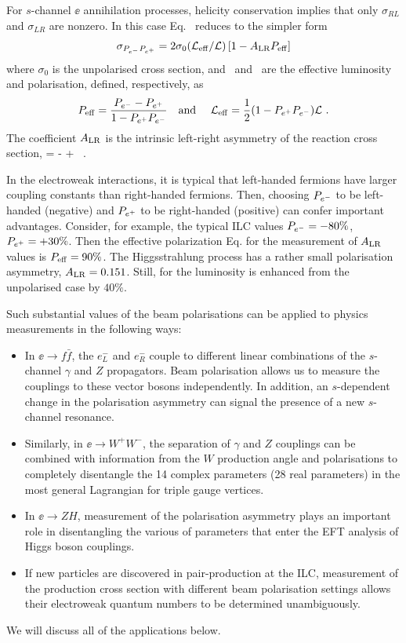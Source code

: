 For $s$-channel $\ee$ annihilation processes, helicity conservation implies that only $\sigma_{RL}$ and $\sigma_{LR}$ are nonzero.
In this case Eq.~ reduces to the simpler form
\begin{equation}
 \sigma_{P_{e^-}P_{e^+}} = 2 \sigma_0 (\mathcal{L}_{\mathrm{eff}}/\mathcal{L}) \left[1 - A_{\mathrm{LR}} P_{\mathrm{eff}} \right]
\label{eq:pol:xsecschan}
\end{equation}
where $\sigma_0$ is the unpolarised cross section, and \Leff\ and \Peff\  
are the effective luminosity and polarisation, defined, respectively, as 
\begin{equation}
P_{\mathrm{eff}}= \frac{P_{e^-} - P_{e^+}}{1 - P_{e^+}P_{e^-}}
\label{eq:def-leff-peff}
\quad\mbox{\rm and }\quad
\mathcal{L}_{\mathrm{eff}}=\frac{1}{2}(1 -P_{e^+}P_{e^-}){\cal L} \ . 
\end{equation}
The coefficient $A_{\mathrm{LR}}$ is the intrinsic left-right asymmetry of the reaction cross section,
\beq
  \ALR =    {\sigmaLR - \sigmaRL\over \sigmaLR + \sigmaRL } \ . 
\eeq{eq:def-ALR}

In the electroweak interactions, it is typical that left-handed fermions have larger coupling constants than right-handed fermions.   Then, choosing $P_{e^-}$ to be left-handed (negative) and $P_{e^+}$ to be right-handed (positive) can confer important advantages.
Consider, for example, the typical ILC values $P_{e^-} = -80\%$, $P_{e^+} = +30\%$.    Then the effective polarization 
Eq. \leqn{eq:def-leff-peff} for the measurement of $A_{\mathrm{LR}}$ values is  $P_{\mathrm{eff}} = 90\%$.   The Higgsstrahlung process has a rather small polarisation asymmetry, $A_{\mathrm{LR}} = 0.151$. Still, for the luminosity is enhanced from the unpolarised case by  $ 40\%$. 

Such substantial values of the beam polarisations can be applied to physics measurements in the following ways:
\begin{itemize}
\item In $\ee\to f\bar f$, the $e^-_L$ and $e^-_R$ couple to different linear combinations of the $s$-channel $\gamma$ and $Z$
propagators.  Beam polarisation allows us to measure the couplings to these vector bosons independently.  In addition, an $s$-dependent change in the polarisation asymmetry can signal the presence of a new $s$-channel resonance.  
\item Similarly, in $\ee\to W^+W^-$, the separation of $\gamma$ and $Z$ couplings can be combined with information from the $W$ production angle and polarisations to completely disentangle the 14 complex parameters (28 real parameters) in the most general 
Lagrangian for triple gauge vertices.
\item In $\ee\to ZH$, measurement of  the polarisation asymmetry plays an important role in disentangling the various of  parameters 
that enter the EFT analysis of Higgs boson couplings.
\item If new particles are discovered in pair-production at the ILC, measurement of the production cross section with different beam polarisation settings allows their electroweak quantum numbers to be determined unambiguously.
\end{itemize}
We will discuss all of the applications below.

